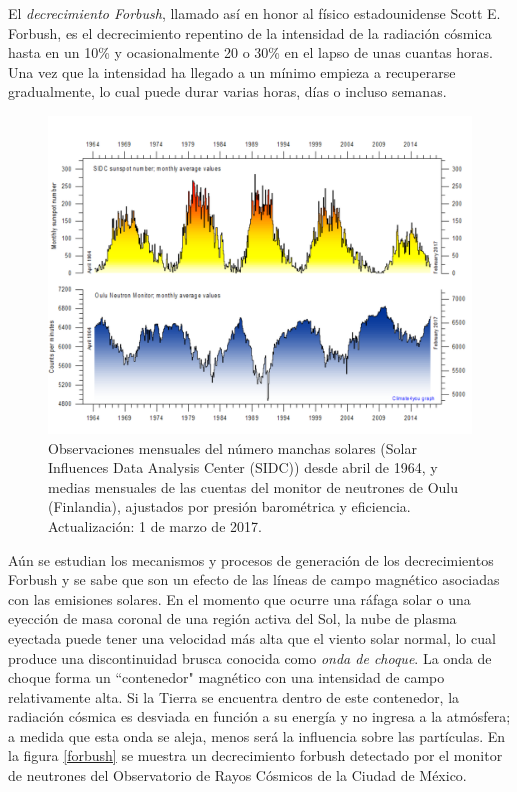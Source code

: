 El \emph{decrecimiento Forbush}, llamado así en honor al físico estadounidense Scott E. Forbush, es el decrecimiento repentino de la intensidad de la radiación cósmica hasta en un 10\% y ocasionalmente 20 o 30\% en el lapso de unas cuantas horas. Una vez que la intensidad ha llegado a un mínimo empieza a recuperarse gradualmente, lo cual puede durar varias horas, días o incluso semanas.\\

\begin{figure}[H]
\centering
\includegraphics[scale=0.50]{Capitulo1/figs/cr_vs_sunspots.pdf}
\caption{Observaciones mensuales del número manchas solares (Solar Influences Data Analysis Center (SIDC)) desde abril de 1964, y medias mensuales de las cuentas del monitor de neutrones de Oulu (Finlandia), ajustados por presión barométrica y eficiencia. Actualización: 1 de marzo de 2017.}
\label{sunspot} 
\end{figure}
 
Aún se estudian los mecanismos y procesos de generación de los decrecimientos Forbush y se sabe que son un efecto de las líneas de campo magnético asociadas con las emisiones solares. En el momento que ocurre una ráfaga solar o una eyección de masa coronal de una región activa del Sol, la nube de plasma eyectada puede tener una velocidad más alta que el viento solar normal, lo cual produce una discontinuidad brusca conocida como \emph{onda de choque}. La onda de choque forma un ``contenedor" magnético con una intensidad de campo relativamente alta. Si la Tierra se encuentra dentro de este contenedor, la radiación cósmica es desviada en función a su energía y no ingresa a la atmósfera; a medida que esta onda se aleja, menos será la influencia sobre las partículas\cite{grieder,mensajeros}. En la figura \ref{forbush} se muestra un decrecimiento forbush detectado por el monitor de neutrones del Observatorio de Rayos Cósmicos de la Ciudad de México.\\

